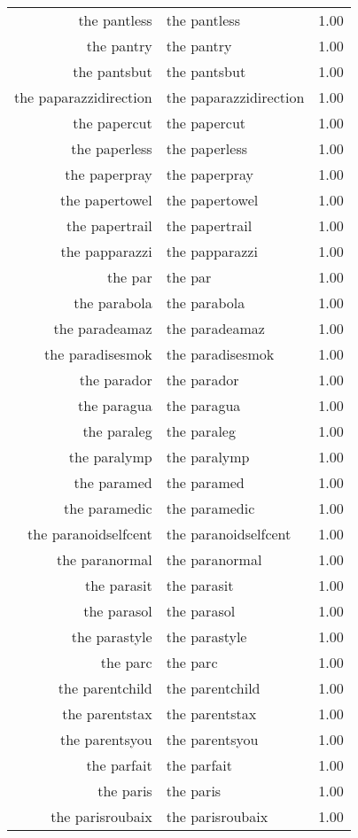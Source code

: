 \begin{table}[ht]
\begin{tabular}{rlr}
  the pantless & the pantless & 1.00 \\ 
  the pantry & the pantry & 1.00 \\ 
  the pantsbut & the pantsbut & 1.00 \\ 
  the paparazzidirection & the paparazzidirection & 1.00 \\ 
  the papercut & the papercut & 1.00 \\ 
  the paperless & the paperless & 1.00 \\ 
  the paperpray & the paperpray & 1.00 \\ 
  the papertowel & the papertowel & 1.00 \\ 
  the papertrail & the papertrail & 1.00 \\ 
  the papparazzi & the papparazzi & 1.00 \\ 
  the par & the par & 1.00 \\ 
  the parabola & the parabola & 1.00 \\ 
  the paradeamaz & the paradeamaz & 1.00 \\ 
  the paradisesmok & the paradisesmok & 1.00 \\ 
  the parador & the parador & 1.00 \\ 
  the paragua & the paragua & 1.00 \\ 
  the paraleg & the paraleg & 1.00 \\ 
  the paralymp & the paralymp & 1.00 \\ 
  the paramed & the paramed & 1.00 \\ 
  the paramedic & the paramedic & 1.00 \\ 
  the paranoidselfcent & the paranoidselfcent & 1.00 \\ 
  the paranormal & the paranormal & 1.00 \\ 
  the parasit & the parasit & 1.00 \\ 
  the parasol & the parasol & 1.00 \\ 
  the parastyle & the parastyle & 1.00 \\ 
  the parc & the parc & 1.00 \\ 
  the parentchild & the parentchild & 1.00 \\ 
  the parentstax & the parentstax & 1.00 \\ 
  the parentsyou & the parentsyou & 1.00 \\ 
  the parfait & the parfait & 1.00 \\ 
  the paris & the paris & 1.00 \\ 
  the parisroubaix & the parisroubaix & 1.00 \\ 

\end{tabular}
\end{table}
